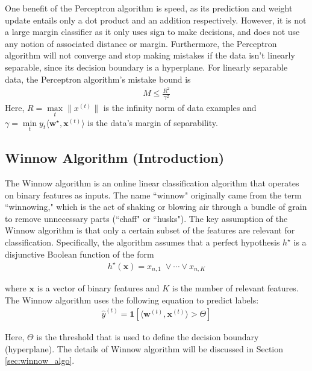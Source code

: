 \documentclass[11pt]{article}
\begin{document}
One benefit of the Perceptron algorithm is speed, as its prediction and weight update entails only a dot product and an addition respectively. However, it is not a large margin classifier as it only uses sign to make decisions, and does not use any notion of associated distance or margin. Furthermore, the Perceptron algorithm will not converge and stop making mistakes if the data isn't linearly separable, since its decision boundary is a hyperplane.
For linearly separable data, the Perceptron algorithm's mistake bound \cite{novikoff1963convergence} is 
\begin{align}
    M \leq \frac{R^2}{\gamma^2}   
\end{align}
Here, $R=\max\limits_t \|x^{(t)}\|$ is the infinity norm of data examples and $\gamma=\min\limits_t y_t \langle \textbf{w}^\star, \textbf{x}^{(t)} \rangle$ is the data's margin of separability.


\subsection{Winnow Algorithm (Introduction)}
The Winnow algorithm is an online linear classification algorithm that operates on binary features as inputs. The name ``winnow" originally came from the term ``winnowing," which is the act of shaking or blowing air through a bundle of grain to remove unnecessary parts (``chaff" or ``husks").
The key assumption of the Winnow algorithm is that only a certain subset of the features are relevant for classification. Specifically, the algorithm assumes that a perfect hypothesis $h^\star$ is a disjunctive Boolean function \cite{littlestone1988winnow} of the form
\begin{align}
    h^\star(\boldsymbol{x})=x_{n,1}\;\vee\cdots\vee x_{n,K}
\end{align}

where $\boldsymbol{x}$ is a vector of binary features and $K$ is the number of relevant features. The Winnow algorithm uses the following equation to predict labels:
\begin{align}
    \hat{y}^{(t)} = \boldsymbol{1}\left[\langle\boldsymbol{w}^{(t)},\boldsymbol{x}^{(t)}\rangle > \Theta\right]
\end{align}

Here, $\Theta$ is the threshold that is used to define the decision boundary (hyperplane). The details of Winnow algorithm will be discussed in Section \ref{sec:winnow_algo}.
\end{document}
